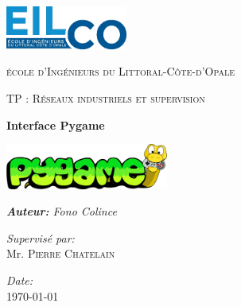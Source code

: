 \documentclass{article}
\begin{document}
\begin{titlepage}
    \centering
    \includegraphics[width=0.3\textwidth]{EILCO-LOGO-2022.png}\par\vspace{1cm}
    {\scshape\LARGE école d'Ingénieurs du Littoral-Côte-d'Opale\par}
    \vspace{1cm}
    {\scshape\Large TP : Réseaux industriels et supervision\par} 
    \vspace{1.5cm}
    {\huge\bfseries  Interface Pygame\par}
    \vspace{0.5cm}
    \includegraphics[width=0.4\textwidth]{logo.png}\par
    \vspace{1.5cm}
    {\Large\itshape\textbf{Auteur:} Fono Colince\par}
    \vfill
    \begin{minipage}{0.4\textwidth}
        \begin{flushleft} \large
            \emph{Supervisé par:}\\
            Mr. \textsc{Pierre Chatelain} \\
        \end{flushleft}
    \end{minipage}
    \begin{minipage}{0.4\textwidth}
        \begin{flushright} \large
            \emph{Date:} \\
            \today
        \end{flushright}
    \end{minipage}
    \vfill
    \vspace{1cm}
\end{titlepage}

\clearpage

\tableofcontents  %

\clearpage
\end{document}
